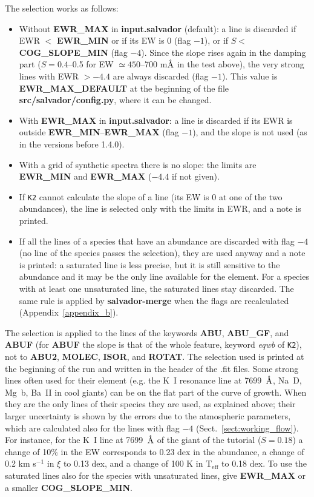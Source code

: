 \documentclass[modern]{aastex701}
\newcommand{\angstrom}{\mbox{\normalfont\AA}}
\begin{document}
The selection works as follows:
\begin{itemize}
    \item Without {\bf EWR\_MAX} in {\bf input.salvador} (default): a line is discarded if EWR $<$ {\bf EWR\_MIN} or if its EW is 0 (flag $-1$), or if $S <$ {\bf COG\_SLOPE\_MIN} (flag $-4$). Since the slope rises again in the damping part ($S = 0.4$--0.5 for EW $\simeq 450$--700 m$\angstrom$ in the test above), the very strong lines with EWR $> -4.4$ are always discarded (flag $-1$). This value is {\bf EWR\_MAX\_DEFAULT} at the beginning of the file {\bf src/salvador/config.py}, where it can be changed.
    \item With {\bf EWR\_MAX} in {\bf input.salvador}: a line is discarded if its EWR is outside {\bf EWR\_MIN}--{\bf EWR\_MAX} (flag $-1$), and the slope is not used (as in the versions before 1.4.0).
    \item With a grid of synthetic spectra there is no slope: the limits are {\bf EWR\_MIN} and {\bf EWR\_MAX} ($-4.4$ if not given).
    \item If \texttt{K2} cannot calculate the slope of a line (its EW is 0 at one of the two abundances), the line is selected only with the limits in EWR, and a note is printed.
    \item If all the lines of a species that have an abundance are discarded with flag $-4$ (no line of the species passes the selection), they are used anyway and a note is printed: a saturated line is less precise, but it is still sensitive to the abundance and it may be the only line available for the element. For a species with at least one unsaturated line, the saturated lines stay discarded. The same rule is applied by {\bf salvador-merge} when the flags are recalculated (Appendix~\ref{appendix_b}).
\end{itemize}
The selection is applied to the lines of the keywords {\bf ABU}, {\bf ABU\_GF}, and {\bf ABUF} (for {\bf ABUF} the slope is that of the whole feature, keyword {\it eqwb} of \texttt{K2}), not to {\bf ABU2}, {\bf MOLEC}, {\bf ISOR}, and {\bf ROTAT}. The selection used is printed at the beginning of the run and written in the header of the .fit files. Some strong lines often used for their element (e.g. the K~I resonance line at 7699~$\angstrom$, Na~D, Mg~b, Ba~II in cool giants) can be on the flat part of the curve of growth. When they are the only lines of their species they are used, as explained above; their larger uncertainty is shown by the errors due to the atmospheric parameters, which are calculated also for the lines with flag $-4$ (Sect.~\ref{sect:working_flow}). For instance, for the K~I line at 7699~$\angstrom$ of the giant of the tutorial ($S = 0.18$) a change of 10\% in the EW corresponds to 0.23 dex in the abundance, a change of 0.2 km s$^{-1}$ in $\xi$ to 0.13 dex, and a change of 100 K in T$_{\mathrm{eff}}$ to 0.18 dex. To use the saturated lines also for the species with unsaturated lines, give {\bf EWR\_MAX} or a smaller {\bf COG\_SLOPE\_MIN}.
\end{document}
